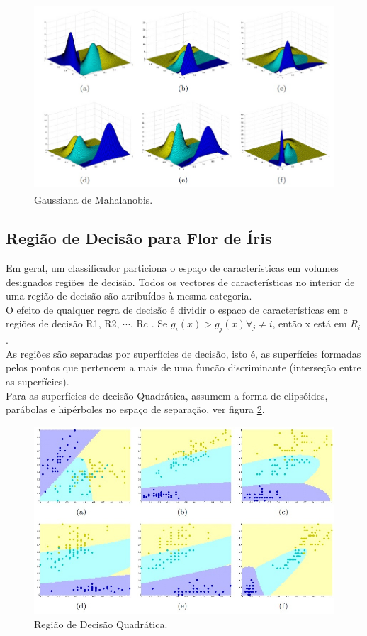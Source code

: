 \documentclass[a4paper]{article}
\begin{document}
\begin{figure}[H]
\centering

\includegraphics[height=7cm]{Imagens/plotGauss_type4.jpg}

\caption{Gaussiana de Mahalanobis.}
\label{fig:Figura8}
\end{figure}


\subsection{Região de Decisão para Flor de Íris}

Em geral, um classificador particiona o espaço de características em volumes designados regiões de decisão. Todos os vectores de características no interior de uma região de decisão são atribuídos à mesma categoria.\\


O efeito de qualquer regra de decisão é dividir o espaco de características em c regiões de decisão R1, R2, $\cdots$, Rc . Se $g_i (x) > g_j(x)  \forall_j \neq i$, então x está em $R_i$ . \\

As regiões são separadas por superfícies de decisão, isto é, as superfícies formadas pelos pontos que pertencem a mais de uma funcão discriminante (interseção entre as superfícies).\\

Para as superfícies de decisão Quadrática, assumem a forma de elipsóides, parábolas e hipérboles no espaço de separação, ver figura \ref{fig:Figura9}.


\begin{figure}[H]
\centering

\includegraphics[height=7cm]{Imagens/decisionboundary_type1.jpg}

\caption{Região de Decisão Quadrática.}
\label{fig:Figura9}
\end{figure}
\end{document}
